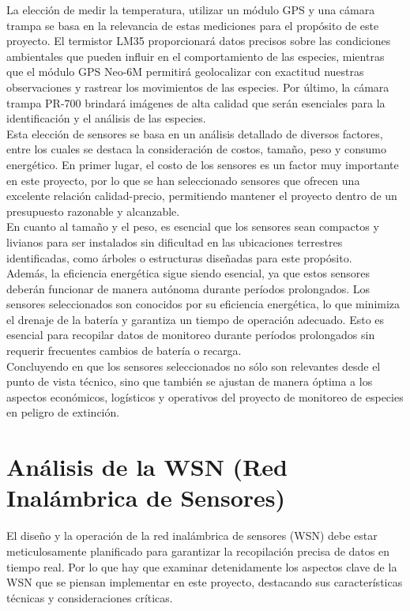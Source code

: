 \noindent La elección de medir la temperatura, utilizar un módulo GPS y una cámara trampa se basa en la relevancia de estas mediciones para el propósito de este proyecto. El termistor LM35 proporcionará datos precisos sobre las condiciones ambientales que pueden influir en el comportamiento de las especies, mientras que el módulo GPS Neo-6M permitirá geolocalizar con exactitud nuestras observaciones y rastrear los movimientos de las especies. Por último, la cámara trampa PR-700 brindará imágenes de alta calidad que serán esenciales para la identificación y el análisis de las especies.\\
Esta elección de sensores se basa en un análisis detallado de diversos factores, entre los cuales se destaca la consideración de costos, tamaño, peso y consumo energético. En primer lugar, el costo de los sensores es un factor muy importante en este proyecto, por lo que se han seleccionado sensores que ofrecen una excelente relación calidad-precio, permitiendo mantener el proyecto dentro de un presupuesto razonable y alcanzable.\\
En cuanto al tamaño y el peso, es esencial que los sensores sean compactos y livianos para ser instalados sin dificultad en las ubicaciones terrestres identificadas, como árboles o estructuras diseñadas para este propósito.\\
Además, la eficiencia energética sigue siendo esencial, ya que estos sensores deberán funcionar de manera autónoma durante períodos prolongados. Los sensores seleccionados son conocidos por su eficiencia energética, lo que minimiza el drenaje de la batería y garantiza un tiempo de operación adecuado. Esto es esencial para recopilar datos de monitoreo durante períodos prolongados sin requerir frecuentes cambios de batería o recarga.\\
Concluyendo en que los sensores seleccionados no sólo son relevantes desde el punto de vista técnico, sino que también se ajustan de manera óptima a los aspectos económicos, logísticos y operativos del proyecto de monitoreo de especies en peligro de extinción.

\newpage
\section{Análisis de la WSN (Red Inalámbrica de Sensores)}

El diseño y la operación de la red inalámbrica de sensores (WSN) debe estar meticulosamente planificado para garantizar la recopilación precisa de datos en tiempo real. Por lo que hay que examinar detenidamente los aspectos clave de la WSN que se piensan implementar en este proyecto, destacando sus características técnicas y consideraciones críticas.
